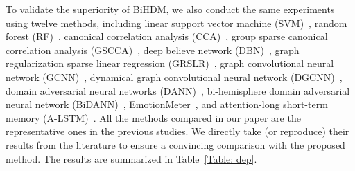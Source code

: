 \documentclass[journal]{IEEEtran}
\begin{document}
To validate the superiority of BiHDM, we also conduct the same experiments using twelve methods, including linear support vector machine (SVM)~\cite{suykens1999least}, random forest (RF)~\cite{breiman2001random}, canonical correlation analysis (CCA)~\cite{thompson2005canonical}, group sparse canonical correlation analysis (GSCCA)~\cite{zheng2016Multichannel}, deep believe network (DBN)~\cite{zheng2015investigating}, graph regularization sparse linear regression (GRSLR)~\cite{li2018eeg}, graph convolutional neural network (GCNN)~\cite{defferrard2016convolutional}, dynamical graph convolutional neural network (DGCNN)~\cite{song2018eeg}, domain adversarial neural networks (DANN)~\cite{ganin2016domain}, bi-hemisphere domain adversarial neural network (BiDANN)~\cite{li2018novel}, EmotionMeter~\cite{zheng2018emotionmeter}, and attention-long short-term memory (A-LSTM)~\cite{8606087}. All the methods compared in our paper are the representative ones in the previous studies. We directly take (or reproduce) their results from the literature to ensure a convincing comparison with the proposed method. The results are summarized in Table~\ref{Table: dep}.
\end{document}
